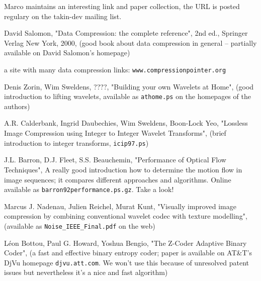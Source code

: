 
Marco maintains an interesting link and paper collection, the URL is posted
regulary on the takin-dev mailing list.


\begin{thebibliography}{888}

David Salomon, "Data Compression: the complete reference", 2nd ed., 
Springer Verlag New York, 2000,
(good book about data compression in general -- partially available on David Salomon's homepage)


a site with many data compression links: \verb|www.compressionpointer.org|


Denis Zorin, Wim Sweldens, ????,
"Building your own Wavelets at Home", 
(good introduction to lifting wavelets, available as \verb|athome.ps| on the homepages of the authors)


A.R. Calderbank, Ingrid Daubechies, Wim Sweldens, Boon-Lock Yeo,
"Lossless Image Compression using Integer to Integer Wavelet Transforms",
(brief introduction to integer transforms, \verb|icip97.ps|)

J.L. Barron, D.J. Fleet, S.S. Beauchemin,
"Performance of Optical Flow Techniques",
A really good introduction how to determine the motion flow in image sequences;
it compares different approaches and algorithms. Online available as 
\verb|barron92performance.ps.gz|.
Take a look!


Marcus J. Nadenau, Julien Reichel, Murat Kunt,
"Visually improved image compression by combining conventional wavelet codec 
with texture modelling",
(available as \verb|Noise_IEEE_Final.pdf| on the web)


L\'eon Bottou, Paul G. Howard, Yoshua Bengio,
"The Z-Coder Adaptive Binary Coder",
(a fast and effective binary entropy coder; paper is available on AT\&T's 
DjVu homepage \verb|djvu.att.com|. We won't use this because of unresolved
patent issues but nevertheless it's a nice and fast algorithm)

\end{thebibliography}
